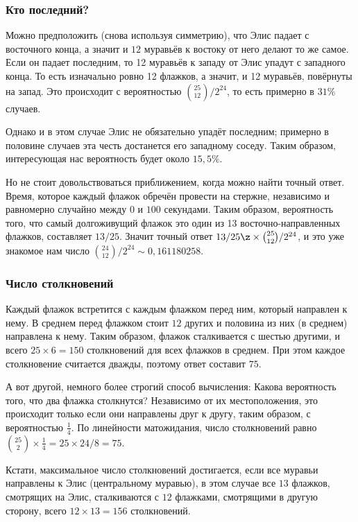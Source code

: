 \subsubsection*{Кто последний?}

Можно предположить (снова используя симметрию), что Элис падает с восточного конца,
а значит и $12$ муравьёв к востоку от него делают то же самое.
Если он падает последним, то 12 муравьёв к западу от Элис упадут с западного конца.
То есть изначально ровно 12 флажков, а значит, и 12 муравьёв, повёрнуты на запад.
Это происходит с вероятностью $\binom{25}{12}/2^{24}$, то есть примерно в $31\%$ случаев.

Однако и в этом случае Элис не обязательно упадёт последним;
примерно в половине случаев эта честь достанется его западному соседу.
Таким образом, интересующая нас вероятность будет около $15{,}5\%$.

Но не стоит довольствоваться приближением, когда можно найти точный ответ.
Время, которое каждый флажок обречён провести на стержне, независимо и равномерно случайно между $0$ и $100$ секундами.
Таким образом, вероятность того, что самый долгоживущий флажок это один из 13 восточно-направленных флажков, составляет $13/25$.
Значит точный ответ $13/25 \z\times\binom{25}{12}/2^{24}$, и это уже знакомое нам число $\binom{24}{12}/2^{24}\sim 0{,}161180258$.

\subsubsection*{Число столкновений}

Каждый флажок встретится с каждым флажком перед ним, который направлен к нему.
В среднем перед флажком стоит $12$ других и
половина из них (в среднем) направлена к нему.
Таким образом, флажок сталкивается с шестью другими, и всего $25 \times 6 = 150$ столкновений для всех флажков в среднем.
При этом каждое столкновение считается дважды, поэтому ответ составит $75$.

А вот другой, немного более строгий способ вычисления:
Какова вероятность того, что два флажка столкнутся?
Независимо от их местоположения, это происходит только если они направлены друг к другу,
таким образом, с вероятностью $\tfrac14$.
По линейности матожидания, число столкновений равно $\binom{25}2 \times \tfrac14 = 25 \times 24 /8 = 75$.

Кстати, максимальное число столкновений достигается, если все муравьи направлены к Элис (центральному муравью), в этом случае все $13$ флажков, смотрящих на Элис, сталкиваются с $12$ флажками, смотрящими в другую сторону, всего $12 \times 13 = 156$ столкновений.

